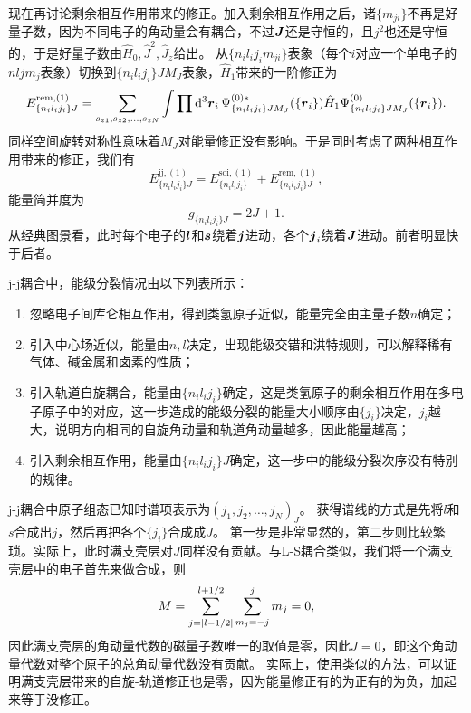 \documentclass[UTF8, a4paper]{ctexart}
\begin{document}
现在再讨论剩余相互作用带来的修正。加入剩余相互作用之后，诸$\{m_{ji}\}$不再是好量子数，因为不同电子的角动量会有耦合，不过$\vb*{J}$还是守恒的，且$j^2$也还是守恒的，于是好量子数由$\hat{H}_0, \hat{J}^2, \hat{J}_z$给出。
从$\{n_i l_i j_i m_{ji}\}$表象（每个$i$对应一个单电子的$nl j m_j$表象）切换到$\{n_i l_i j_i\} J M_J$表象，$\hat{H}_1$带来的一阶修正为
\begin{equation}
    E^{\text{rem}, (1)}_{\{n_i l_i j_i\} J} = \sum_{s_{z1}, s_{z2}, \ldots, s_{zN}} \int \prod \dd[3]{\vb*{r}_i} \Psi^{(0) *}_{\{n_i l_i j_i\} J M_J}(\{\vb*{r}_i\}) \hat{H}_1 \Psi^{(0)}_{\{n_i l_i j_i\} J M_J}(\{\vb*{r}_i\}).
\end{equation}
同样空间旋转对称性意味着$M_J$对能量修正没有影响。于是同时考虑了两种相互作用带来的修正，我们有
\begin{equation}
    E^{\text{jj}, (1)}_{\{n_i l_i j_i\} J} = E^{\text{soi}, (1)}_{\{n_i l_i j_i\}} + E^{\text{rem}, (1)}_{\{n_i l_i j_i\} J},
\end{equation}
能量简并度为
\begin{equation}
    g_{\{n_i l_i j_i\}J} = 2J+1.
\end{equation}
从经典图景看，此时每个电子的$\vb*{l}$和$\vb*{s}$绕着$\vb*{j}$进动，各个$\vb*{j}_i$绕着$\vb*{J}$进动。前者明显快于后者。

j-j耦合中，能级分裂情况由以下列表所示：
\begin{enumerate}
    \item 忽略电子间库仑相互作用，得到类氢原子近似，能量完全由主量子数$n$确定；
    \item 引入中心场近似，能量由$n, l$决定，出现能级交错和洪特规则，可以解释稀有气体、碱金属和卤素的性质；
    \item 引入轨道自旋耦合，能量由$\{n_i l_i j_i\}$确定，这是类氢原子的剩余相互作用在多电子原子中的对应，这一步造成的能级分裂的能量大小顺序由$\{j_i\}$决定，$j_i$越大，说明方向相同的自旋角动量和轨道角动量越多，因此能量越高；
    \item 引入剩余相互作用，能量由$\{n_i l_i j_i\} J$确定，这一步中的能级分裂次序没有特别的规律。
\end{enumerate}

j-j耦合中原子组态已知时谱项表示为$(j_1, j_2, \ldots, j_N)_J$。
获得谱线的方式是先将$l$和$s$合成出$j$，然后再把各个$\{j_i\}$合成成$J$。
第一步是非常显然的，第二步则比较繁琐。实际上，此时满支壳层对$J$同样没有贡献。与L-S耦合类似，我们将一个满支壳层中的电子首先来做合成，则
\[
    M = \sum_{j=\abs{l-1/2}}^{l+1/2} \sum_{m_j=-j}^j m_j = 0,
\]
因此满支壳层的角动量代数的磁量子数唯一的取值是零，因此$J=0$，即这个角动量代数对整个原子的总角动量代数没有贡献。
实际上，使用类似的方法，可以证明满支壳层带来的自旋-轨道修正也是零，因为能量修正有的为正有的为负，加起来等于没修正。
\end{document}
